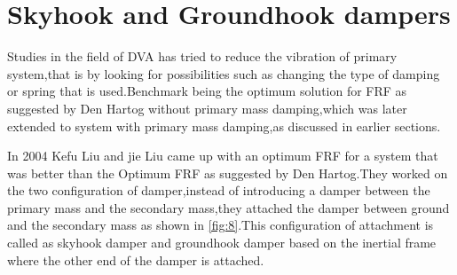 %
\section{Skyhook and Groundhook dampers}
Studies in the field of DVA has tried to reduce the vibration of primary system,that is by  looking for possibilities such as changing the type of damping or spring that is used.Benchmark being the optimum solution for FRF as suggested by Den Hartog without primary mass damping,which was later extended to system with primary mass damping,as discussed in earlier sections.

In 2004 Kefu Liu and jie Liu came up with an optimum FRF for a system that was better than the Optimum FRF as suggested by Den Hartog.They worked on the two configuration of damper,instead of introducing a damper between the primary mass and the secondary mass,they attached the damper between ground and the secondary mass as shown in \ref{fig:8}.This configuration of attachment is called as skyhook damper and groundhook damper based on the inertial frame where the other end of the damper is attached.


